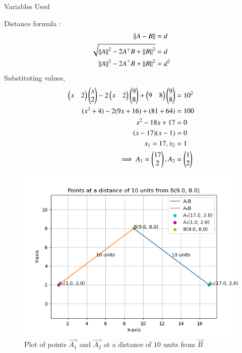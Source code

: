 \documentclass[journal]{IEEEtran}
\begin{document}
\solution
\begin{table}[h!]    
  \centering
  
  \caption{Variables Used}
  \label{tab1.9.19.1}
\end{table}
Distance formula :
\begin{align}
    \left\lVert A-B\right\rVert&=d \\
    \sqrt{\left\lVert A\right\rVert^2-2A^\top B+\left\lVert B\right\rVert^2}&=d \\
    \left\lVert A\right\rVert^2-2A^\top B+\left\lVert B\right\rVert^2&=d^2
\end{align}
Substituting values,
\begin{align}
    \begin{pmatrix}x&2\end{pmatrix}\begin{pmatrix}x\\2\end{pmatrix}-2\begin{pmatrix}x&2\end{pmatrix}\begin{pmatrix}9\\8\end{pmatrix}+\begin{pmatrix}9&8\end{pmatrix}\begin{pmatrix}9\\8\end{pmatrix}&=10^2 \\
    (x^2+4)-2(9x+16)+(81+64)&=100 \\
	x^2-18x+17&=0 \\
	(x-17)(x-1)&=0 \\
    x_1=17, x_2&=1 \\
    \implies A_1=\begin{pmatrix}17\\2\end{pmatrix}, A_2&=\begin{pmatrix}1\\2\end{pmatrix}
\end{align}
\begin{figure}[ht!]
	\centering
   	\includegraphics[width=0.8\linewidth]{figs/plot.png}
   	\caption{Plot of points $\vec{A_1}$ and $\vec{A_2}$ at a distance of $10$ units from $\vec{B}$}
\label{Plot}
\end{figure}
\end{document}
